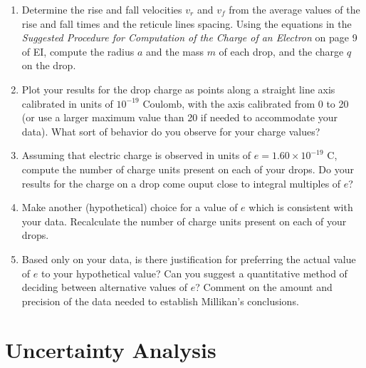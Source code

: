 \begin{enumerate}
\item Determine the rise and fall velocities
$v_r$ and $v_f$ from the average values of the
rise and fall times and the reticule lines spacing. Using the equations
in the {\em Suggested Procedure for Computation of
the Charge of an Electron} on page 9 of EI,
compute the radius $a$ and the mass $m$ of each drop, and the charge $q$ on
the drop. 


\item Plot your results for the drop charge as points along a
straight line axis calibrated in units of
$10^{-19}$ Coulomb, with the axis
calibrated from 0 to 20 (or use a larger maximum value than 20 if
needed to accommodate your data).  What sort of behavior do you
observe for your charge values?

\item Assuming that electric charge is observed in units of $e =
1.60 \times 10^{-19}$ C, compute the
number of charge units present on each of your drops.  Do your results
for the charge on a drop come ouput close to integral multiples of $e$?

\item Make another (hypothetical) choice for a value of $e$ which is
consistent with your data.  Recalculate the number of charge units
present on each of your drops.

\item Based only on your data, is there justification for preferring the
actual value of $e$ to your hypothetical value?  Can you suggest a quantitative method of deciding
between alternative values of $e$?  Comment on the amount and precision
of the data needed to establish Millikan's
conclusions.
\end{enumerate}

\section{Uncertainty Analysis}

